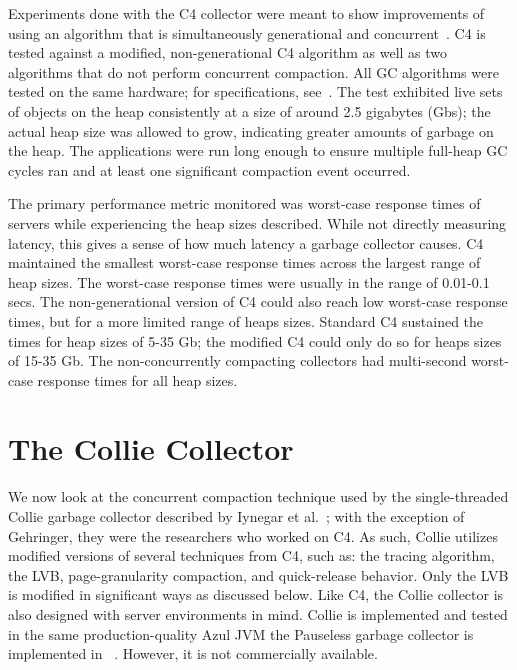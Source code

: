 \documentclass{sig-alternate}
\begin{document}

Experiments done with the C4 collector were meant to show improvements
of using an algorithm that is simultaneously generational and concurrent~\cite{Tene:C4}.
C4 is tested against a modified, non-generational C4 algorithm as well as
two algorithms that do not perform concurrent compaction. 
All GC algorithms were tested on the same hardware; for specifications, see~\cite{Tene:C4}. 
The test exhibited live sets of objects on 
the heap consistently at a size of around 2.5 gigabytes (Gbs); the actual heap size was allowed 
to grow, indicating greater amounts of garbage on the heap. The applications were run long
enough to ensure multiple full-heap GC cycles ran and at least one
significant compaction event occurred.

The primary performance metric monitored was worst-case response times
of servers while experiencing the heap sizes
described. While not directly measuring latency, this gives a sense of how 
much latency a garbage collector causes. 
C4 maintained the smallest 
worst-case response times across the largest range of heap sizes.
The worst-case response times were usually in the range of 0.01-0.1 secs. 
The non-generational version of C4 could also reach low worst-case response times,
but for a more limited range of heaps sizes. Standard
C4 sustained the times for heap sizes of 5-35 Gb; the modified C4 could
only do so for heaps sizes of 15-35 Gb. The non-concurrently compacting
collectors had multi-second worst-case response times for all heap sizes.


\section{The Collie Collector}
\label{sec:collie}

We now look at the concurrent compaction technique used by the single-threaded
Collie garbage collector described by Iynegar et al.~\cite{Iyengar:Collie};
with the exception of Gehringer, they were the researchers who worked on C4.
As such, Collie utilizes modified versions of several techniques from C4, such as:
the tracing algorithm, the LVB, page-granularity compaction, and quick-release behavior.
Only the LVB is modified in significant ways as discussed below.
Like C4, the Collie
collector is also designed with server environments in mind. 
Collie is implemented and tested in 
the same production-quality Azul JVM the Pauseless garbage collector is implemented in
~\cite{Click:Pauseless}. However, it is not commercially available.
\end{document}
